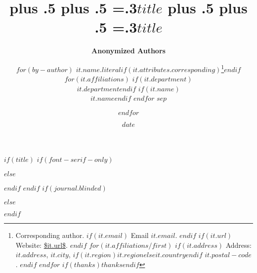 $if(title)$
$if(font-serif-only)$
\title{\bfseries\huge\parfillskip=0pt
\rightskip=0pt plus .5\textwidth
\leftskip=0pt plus .5\textwidth
\emergencystretch=.3\textwidth $title$}
$else$
\title{\sffamily\bfseries\huge\parfillskip=0pt
\rightskip=0pt plus .5\textwidth
\leftskip=0pt plus .5\textwidth
\emergencystretch=.3\textwidth $title$}
$endif$
$endif$
$if(journal.blinded)$
\author{\textbf{Anonymized Authors}}
$else$
\author{$for(by-author)$
\textbf{$it.name.literal$}$if(it.attributes.corresponding)$\footnote{
Corresponding author.
$if(it.email)$
Email \texttt{\href{mailto:$it.email$}{$it.email$}}.
$endif$
$if(it.url)$
Website: \url{$it.url$}.
$endif$
$for(it.affiliations/first)$
$if(it.address)$
Address:
$it.address$, $it.city$, $if(it.region)$$it.region$$else$$it.country$$endif$ $it.postal-code$.
$endif$
$endfor$
$if(thanks)$$thanks$$endif$}$endif$
$for(it.affiliations)$
$if(it.department)$\\$it.department$$endif$%
$if(it.name)$\\$it.name$$endif$%
\vspace{2pt}
$endfor$ $sep$
\and $endfor$}
$endif$
\date{$date$}
